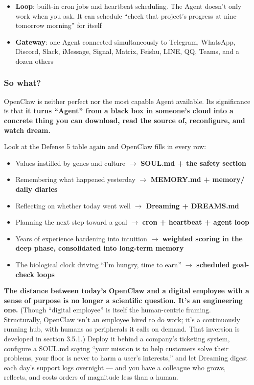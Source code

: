 \documentclass[11pt,a4paper]{article}
\begin{document}
\begin{itemize}
  \item \textbf{Loop}: built-in cron jobs and heartbeat scheduling. The Agent doesn't only work when you ask. It can schedule ``check that project's progress at nine tomorrow morning'' for itself
  \item \textbf{Gateway}: one Agent connected simultaneously to Telegram, WhatsApp, Discord, Slack, iMessage, Signal, Matrix, Feishu, LINE, QQ, Teams, and a dozen others
\end{itemize}

\subsubsection{So what?}

OpenClaw is neither perfect nor the most capable Agent available. Its significance is that \textbf{it turns ``Agent'' from a black box in someone's cloud into a concrete thing you can download, read the source of, reconfigure, and watch dream.}

Look at the Defense 5 table again and OpenClaw fills in every row:

\begin{itemize}
  \item Values instilled by genes and culture $\to$ \textbf{SOUL.md + the safety section}
  \item Remembering what happened yesterday $\to$ \textbf{MEMORY.md + memory/ daily diaries}
  \item Reflecting on whether today went well $\to$ \textbf{Dreaming + DREAMS.md}
  \item Planning the next step toward a goal $\to$ \textbf{cron + heartbeat + agent loop}
  \item Years of experience hardening into intuition $\to$ \textbf{weighted scoring in the deep phase, consolidated into long-term memory}
  \item The biological clock driving ``I'm hungry, time to earn'' $\to$ \textbf{scheduled goal-check loops}
\end{itemize}

\textbf{The distance between today's OpenClaw and a digital employee with a sense of purpose is no longer a scientific question. It's an engineering one.} (Though ``digital employee'' is itself the human-centric framing. Structurally, OpenClaw isn't an employee hired to do work; it's a continuously running hub, with humans as peripherals it calls on demand. That inversion is developed in section 3.5.1.) Deploy it behind a company's ticketing system, configure a SOUL.md saying ``your mission is to help customers solve their problems, your floor is never to harm a user's interests,'' and let Dreaming digest each day's support logs overnight --- and you have a colleague who grows, reflects, and costs orders of magnitude less than a human.
\end{document}
